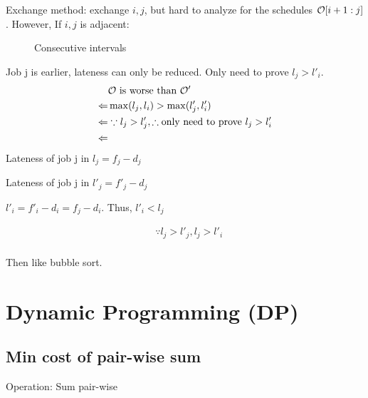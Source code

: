 \documentclass[a4paper]{report}
\begin{document}
Exchange method: exchange $i, j$, but hard to analyze for the schedules $\mathcal{O}[i+1:j]$. However, If $i, j$ is adjacent:
\begin{figure}[!htp]
\centering
{}
\caption{Consecutive intervals}
\label{fig:4_6}
\end{figure}

Job j is earlier, lateness can only be reduced. Only need to prove $l_j>l'_i$.
\begin{align*}
& \mathcal{O} \text{ is worse than } \mathcal{O'} \\
\Leftarrow & \max(l_j, l_i) > \max(l'_j, l'_i) \\
\Leftarrow & \because l_j > l'_j, \therefore \text{only need to prove } l_j>l_i'\\
\Leftarrow &
\end{align*}
Lateness of job j in  $l_j= f_j - d_j$

Lateness of job j in  $l'_j= f'_j - d_j$

$l'_i=f'_i - d_i=f_j-d_i$. Thus, $l'_i<l_j$



\begin{align*}
&\because l_j > l'_j, l_j>l'_i\\
\end{align*}

Then like bubble sort.

\chapter{Dynamic Programming (DP)}
\section{Min cost of pair-wise sum}
Operation: Sum pair-wise 
\end{document}
